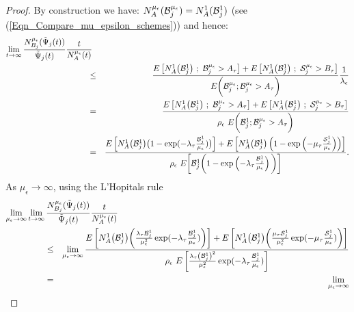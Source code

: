 \begin{proof}
%
%
By construction  we have:
$
N^{{\mu_\epsilon}}_A (   \mathcal{B}_j^{\mu_\epsilon} ) =  N^1_A ( {\mathcal B}_j^1)
$ (see (\ref{Eqn_Compare_mu_epsilon_schemes}))
and hence:
\begin{eqnarray*}
	\lim_{t \to \infty} \frac{N_{B_j}^{\mue}({\tilde  \Psi}_{j} (t))}{{\tilde \Psi}_{j} (t)} \frac{t}{N_A^{\mue}(t)}  \hspace{-2mm} &&
	\\
	&\leq&
	\frac{E \left[ N^1_A \big( \mathcal{B}_j^1\big) \ ; \  \mathcal B^{\mu_\epsilon}_j > A_\tau \right] + E \left[  N^1_A \big( \mathcal{B}_j^1\big) \ ; \  \S_j^{\mu_\epsilon}  >   B_\tau  \right]}{E \bigg(  \mathcal B_j^{\mu_\epsilon}; \mathcal B^{\mu_\epsilon}_j > A_\tau \bigg)}  \frac{1}{\lambda_\epsilon}\\
	&=& \frac{E \left[ N^1_A \big(  \mathcal{B}_j^1\big) \ ; \  \mathcal{B}_j^{\mu_\epsilon} > A_\tau \right] + E \left[  N^1_A \big(  \mathcal{B}_j^1\big) \ ; \  \S_j^{\mu_\epsilon}  >   B_\tau  \right]}{ \rho_\epsilon \ E \bigg(  \mathcal{ B}_j^{1}  ;  \mathcal B_j^{\mu_\epsilon} > A_\tau \bigg)} \\
	&=&  \frac{E \left[ N^1_A \big(  \mathcal{B}_j^1\big) \big( 1 - \exp( - \lambda_\tau  \frac{\mathcal B_j^1}{\mu_\epsilon}) \big) \right] + E \left[  N^1_A \big(  \mathcal{B}_j^1\big) \left ( 1 - \exp \left ( - \mu_\tau  \frac{\S_j^1}{\mu_\epsilon} \right ) \right )  \right]}{ \rho_\epsilon \ E \bigg[   \mathcal{ B}_j^{1}  \bigg( 1 - \exp \left ( - \lambda_\tau  \frac{\mathcal B_j^1}{\mu_\epsilon} \right ) \bigg ) \bigg] }.
\end{eqnarray*}
As $\mu_\epsilon \to \infty$, using the L'Hopitals rule
\begin{eqnarray*}
	\lim_{\mu_\epsilon \to \infty} \lim_{t \to \infty} \frac{N_{B_j}^{\mue}( {\tilde \Psi}_{j} (t))}{{\tilde \Psi}_{j} (t)} \frac{t}{N_A^{\mue}(t)} \hspace{-30mm} \\
	&\leq& \lim_{\mu_\epsilon \to \infty} 
	\frac{E \left[ N^1_A \big(  \mathcal{B}_j^1\big) \bigg(  \frac{\lambda_\tau \mathcal B_j^1}{\mu_\epsilon^2} \exp( - \lambda_\tau  \frac{\mathcal B_j^1}{\mu_\epsilon}) \bigg) \right] + E \left[  N^1_A \big( \mathcal{B}_j^1\big) \bigg( \frac{\mu_\tau \S_j^1}{\mu_\epsilon^2} \exp( - \mu_\tau  \frac{\S_j^1}{\mu_\epsilon}) \bigg)  \right]}{ \rho_\epsilon \ E  \left[   \frac{\lambda_\tau \left ( \mathcal B_j^1 \right )^2 }{\mu_\epsilon^2} \exp( - \lambda_\tau  \frac{\mathcal B_j^1}{\mu_\epsilon})  \right]}\\
	&=&\lim_{\mu_\epsilon \to \infty}

\end{eqnarray*}
\end{proof}
